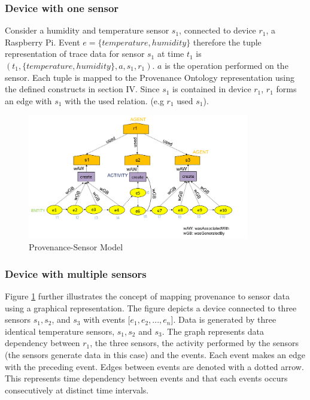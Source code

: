 \documentclass[conference]{IEEEtran}
\begin{document}





\subsubsection{Device with one sensor} 

Consider a humidity and temperature sensor $s_1$, connected to device $r_1$, a Raspberry Pi. Event $e= \{temperature, humidity\}$ therefore the tuple representation of trace data for sensor $s_1$ at time $t_1$ is $(t_1, \{temperature, humidity\}, a,  s_1, r_1)$. $a$ is the operation performed on the sensor. Each tuple is mapped to the Provenance Ontology representation using the defined constructs in section IV. Since $s_1$ is contained in device $r_1$, $r_1$ forms an edge with $s_1$ with the used relation. (e.g $r_1$ used $s_1$). 

\begin{figure}[h!]
\begin{center}

\includegraphics[width=3.8in]{prov_sensor_10.PNG}
\end{center}
\caption{Provenance-Sensor Model }
\label{prov_sensor}
\end{figure}

\subsubsection{Device with multiple sensors} 
Figure \ref{prov_sensor} further illustrates the concept of mapping provenance to sensor data using a graphical representation. The figure depicts a device connected to three sensors $s_1, s_2$, and $s_3$ with events  [$e_1, e_2,...,e_n$]. Data is generated by three identical temperature sensors, $s_1, s_2$ and $s_3$. The graph represents data dependency between $r_1$, the three sensors, the activity performed by the sensors (the sensors generate data in this case) and the events.  Each event makes an edge with the preceding event. Edges between events are denoted with a dotted arrow. This represents time dependency between events and that each events occurs consecutively at distinct time intervals. 
\end{document}

